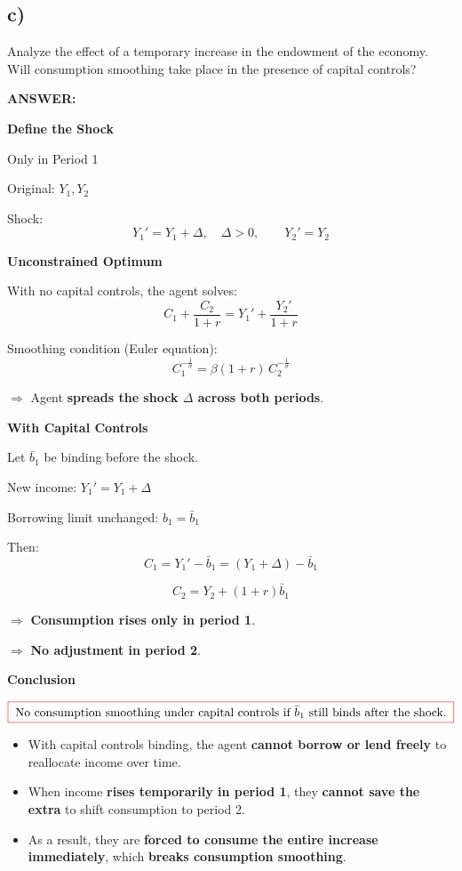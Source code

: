 \documentclass[12pt]{article}
\begin{document}
\subsection*{\noindent\textbf{c)}}

Analyze the effect of a temporary increase in the endowment of the economy. Will
consumption smoothing take place in the presence of capital controls?

\vspace{0.5em}
\noindent\textcolor{formalred}{\textbf{ANSWER:}}

\textbf{Define the Shock}

Only in Period 1  

Original: \( Y_1, Y_2 \)  

Shock:  
\[
Y_1' = Y_1 + \Delta, \quad \Delta > 0, 
\qquad Y_2' = Y_2
\]

\textbf{Unconstrained Optimum}

With no capital controls, the agent solves:  
\[
C_1 + \frac{C_2}{1+r} = Y_1' + \frac{Y_2'}{1+r}
\]

Smoothing condition (Euler equation):  
\[
C_1^{-\tfrac{1}{\sigma}} = \beta(1+r)\, C_2^{-\tfrac{1}{\sigma}}
\]

\(\Rightarrow\) Agent \textbf{spreads the shock \(\Delta\) across both periods}.

\textbf{With Capital Controls}

Let \(\bar{b}_1\) be binding before the shock.  

New income: \( Y_1' = Y_1 + \Delta \)  

Borrowing limit unchanged: \( b_1 = \bar{b}_1 \)  

Then:  
\[
C_1 = Y_1' - \bar{b}_1 = (Y_1 + \Delta) - \bar{b}_1
\]

\[
C_2 = Y_2 + (1+r)\bar{b}_1
\]

\(\Rightarrow\) \textbf{Consumption rises only in period 1}.  

\(\Rightarrow\) \textbf{No adjustment in period 2}.  

\textbf {Conclusion}

\[
\fcolorbox{red}{white}{$
\; \text{No consumption smoothing under capital controls if } \bar{b}_1 \text{ still binds after the shock.} \;
$}
\]

\begin{itemize}
    \item With capital controls binding, the agent \textbf{cannot borrow or lend freely} to reallocate income over time.  
    
    \item When income \textbf{rises temporarily in period 1}, they \textbf{cannot save the extra} to shift consumption to period 2.  
    
    \item As a result, they are \textbf{forced to consume the entire increase immediately}, which \textbf{breaks consumption smoothing}.
\end{itemize}
 
\end{document}
